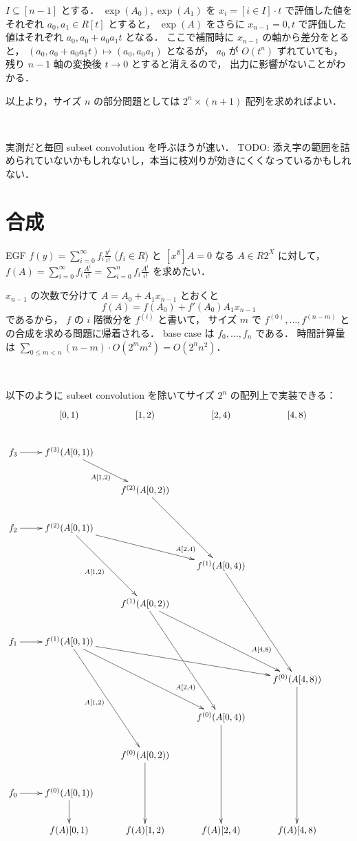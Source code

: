 \documentclass{jsarticle}
\begin{document}
$I \subseteq [n-1]$ とする．
$\exp(A_0), \exp(A_1)$ を $x_i = [i \in I] \cdot t$ で評価した値を
それぞれ $a_0, a_1 \in R[t]$ とすると，
$\exp(A)$ をさらに $x_{n-1} = 0, t$ で評価した値はそれぞれ $a_0, a_0 + a_0 a_1 t$ となる．
ここで補間時に $x_{n-1}$ の軸から差分をとると，
$(a_0, a_0 + a_0 a_1 t) \mapsto (a_0, a_0 a_1)$ となるが，
$a_0$ が $O(t^n)$ ずれていても，残り $n-1$ 軸の変換後 $t \to 0$ とすると消えるので，
出力に影響がないことがわかる．

以上より，サイズ $n$ の部分問題としては $2^n \times (n+1)$ 配列を求めればよい．

\

実測だと毎回 subset convolution を呼ぶほうが速い．
TODO: 添え字の範囲を詰められていないかもしれないし，本当に枝刈りが効きにくくなっているかもしれない．


\section{合成}
EGF $f(y) = \sum_{i=0}^\infty f_i \frac{y^i}{i!}$ ($f_i \in R$) と
$[x^\emptyset] A = 0$ なる $A \in R 2^X$ に対して，
$f(A) = \sum_{i=0}^\infty f_i \frac{A^i}{i!} = \sum_{i=0}^n f_i \frac{A^i}{i!}$ を求めたい．

$x_{n-1}$ の次数で分けて
$A = A_0 + A_1 x_{n-1}$ とおくと
\[
  f(A) = f(A_0) + f'(A_0) A_1 x_{n-1}
\]
であるから，
$f$ の $i$ 階微分を $f^{(i)}$ と書いて，
サイズ $m$ で $f^{(0)}, \ldots, f^{(n-m)}$ との合成を求める問題に帰着される．
base case は $f_0, \ldots, f_n$ である．
時間計算量は $\sum_{0\le m<n} (n-m) \cdot O(2^m m^2) = O(2^n n^2)$．

\

以下のように subset convolution を除いてサイズ $2^n$ の配列上で実装できる：
\[
  \xymatrix{
    & [0, 1) & [1, 2) & [2, 4) & [4, 8) \\
    f_3 \ar[r] & f^{(3)}(A[0,1)) \ar[dr]_{A[1,2)} & & & \\
    & & f^{(2)}(A[0,2)) \ar[ddr]_(.7){A[2,4)} & & \\
    f_2 \ar[r] & f^{(2)}(A[0,1)) \ar[ddr]_{A[1,2)} \ar[drr] & & & \\
    & & & f^{(1)}(A[0,4)) \ar[dddr]_(.7){A[4,8)} & \\
    & & f^{(1)}(A[0,2)) \ar[dddr]_(.7){A[2,4)} \ar[ddrr] & & \\
    f_1 \ar[r] & f^{(1)}(A[0,1)) \ar[dddr]_{A[1,2)} \ar[ddrr] \ar[drrr] & & & \\
    & & & & f^{(0)}(A[4,8)) \ar[dddd] & \\
    & & & f^{(0)}(A[0,4)) \ar[ddd] & \\
    & & f^{(0)}(A[0,2)) \ar[dd] & & \\
    f_0 \ar[r] & f^{(0)}(A[0,1)) \ar[d] & & & \\
    & f(A)[0,1) & f(A)[1,2) & f(A)[2,4) & f(A)[4,8) \\
  }
\]
\end{document}
